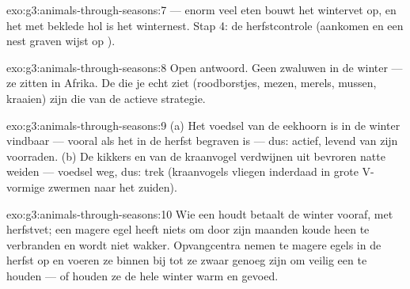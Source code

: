 \begin{solution}{exo:g3:animals-through-seasons:7}
 --- enorm veel eten bouwt het wintervet op, en het met
 beklede hol is het winternest. Stap 4: de herfstcontrole
(aankomen en een nest graven wijst op ).
\end{solution}

\begin{solution}{exo:g3:animals-through-seasons:8}
Open antwoord. Geen zwaluwen in de winter --- ze zitten in Afrika. De
 die je echt ziet (roodborstjes, mezen, merels, mussen, kraaien)
zijn die van de actieve strategie.
\end{solution}

\begin{solution}{exo:g3:animals-through-seasons:9}
(a) Het voedsel van de eekhoorn is in de winter vindbaar --- vooral als
het in de herfst begraven is --- dus: actief, levend van zijn
voorraden. (b) De kikkers en  van de kraanvogel verdwijnen uit
bevroren natte weiden --- voedsel weg, dus: trek (kraanvogels vliegen
inderdaad in grote V-vormige zwermen naar het zuiden).
\end{solution}

\begin{solution}{exo:g3:animals-through-seasons:10}
Wie een  houdt betaalt de winter vooraf, met herfstvet; een
magere egel heeft niets om door zijn maanden koude  heen te
verbranden en wordt niet wakker. Opvangcentra nemen te magere egels in
de herfst op en voeren ze binnen bij tot ze zwaar genoeg zijn om
veilig een  te houden --- of houden ze de hele winter warm
en gevoed.
\end{solution}

